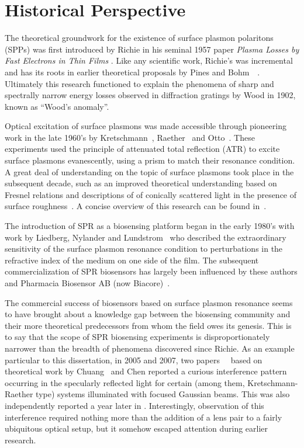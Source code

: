 \documentclass[a4paper,titlepage,onecolumn]{report}
\begin{document}
\section{Historical Perspective}
The theoretical groundwork for the existence of surface plasmon polaritons
(SPPs) was first introduced by Richie in his seminal 1957 paper
\textit{Plasma Losses by Fast Electrons in Thin Films}
\cite{ritchie1957plasma}.  Like any scientific work, Richie's was
incremental and has its roots in earlier theoretical proposals by Pines and
Bohm~\cite{bohm1951collective}~\cite{pines1952collective}.  Ultimately this
research functioned to explain the phenomena of sharp and spectrally narrow
energy losses observed in diffraction gratings by Wood in 1902, known as
``Wood's anomaly''.

Optical excitation of surface plasmons was made accessible through
pioneering work in the late 1960's by Kretschmann~\cite{kretschmann1968},
Raether~\cite{raether1965springer} and Otto~\cite{otto1968excitation}.
These experiments used the principle of attenuated total reflection (ATR)
to excite surface plasmons evanescently, using a prism to match their
resonance condition.  A great deal of understanding on the topic of surface
plasmons took place in the subsequent decade, such as an improved
theoretical understanding based on Fresnel relations
\cite{chen1976excitation} and descriptions of of conically scattered light
in the presence of surface roughness~\cite{simon1976directional}.  A
concise overview of this research can be found in~\cite{raether1997surface}.

The introduction of SPR as a biosensing platform began in the early 1980's
with work by Liedberg, Nylander and Lundstrom~\cite{liedberg1983surface}
who described the extraordinary sensitivity of the surface plasmon
resonance condition to perturbations in the refractive index of the medium
on one side of the film.  The subsequent commercialization of SPR
biosensors has largely been influenced by these authors and Pharmacia
Biosensor AB (now Biacore)~\cite{liedberg1995biosensing}.

The commercial success of biosensors based on surface plasmon resonance
seems to have brought about a knowledge gap between the biosensing
community and their more theoretical predecessors from whom the field owes
its genesis.  This is to say that the scope of SPR biosensing experiments
is disproportionately narrower than the breadth of phenomena discovered
since Richie.  As an example particular to this dissertation, in 2005 and
2007, two papers~\cite{andaloro2005optical}~\cite{simon2007observation}
based on theoretical work by Chuang~\cite{chuang1986lateral} and Chen
\cite{chen1976excitation} reported a curious interference pattern occurring
in the specularly reflected light for certain (among them,
Kretschmann-Raether type) systems illuminated with focused Gaussian beams.
This was also independently reported a year later in
\cite{schumann2008near}.  Interestingly, observation of this interference
required nothing more than the addition of a lens pair to a fairly
ubiquitous optical setup, but it somehow escaped attention during earlier
research.  
\end{document}

